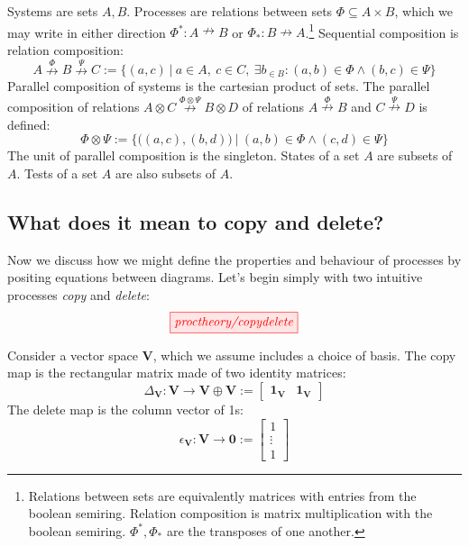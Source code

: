 \begin{example}
Systems are sets $A,B$. Processes are relations between sets $\Phi \subseteq A \times B$, which we may write in either direction $\Phi^*: A \nrightarrow B$ or $\Phi_*: B \nrightarrow A$.\footnote{Relations between sets are equivalently matrices with entries from the boolean semiring. Relation composition is matrix multiplication with the boolean semiring. $\Phi^*,\Phi_*$ are the transposes of one another.}
Sequential composition is relation composition:
\[A \overset{\Phi}{\nrightarrow} B \overset{\Psi}{\nrightarrow} C := \{(a,c) \ | \  a \in A, \ c \in C, \ \exists b_{\in B}: (a,b) \in \Phi \wedge (b,c) \in \Psi  \}\]
Parallel composition of systems is the cartesian product of sets. The parallel composition of relations $A \otimes C \overset{\Phi \otimes \Psi}{\nrightarrow} B \otimes D$ of relations $A \overset{\Phi}{\nrightarrow} B$ and $C \overset{\Psi}{\nrightarrow} D$ is defined:
\[\Phi \otimes \Psi := \{\big( (a,c) , (b,d) \big) \ | \ (a,b) \in \Phi \wedge (c,d) \in \Psi\}\]
The unit of parallel composition is the singleton. States of a set $A$ are subsets of $A$. Tests of a set $A$ are also subsets of $A$.
\end{example}

\subsection{What does it mean to copy and delete?}

Now we discuss how we might define the properties and behaviour of processes by positing equations between diagrams. Let's begin simply with two intuitive processes \emph{copy} and \emph{delete}:
\[\tikzfig{proctheory/copydelete}\]

\begin{example}
Consider a vector space $\mathbf{V}$, which we assume includes a choice of basis. The copy map is the rectangular matrix made of two identity matrices:
\[\Delta_\mathbf{V}: \mathbf{V} \rightarrow \mathbf{V} \oplus \mathbf{V} := \begin{bmatrix} \mathbf{1}_\mathbf{V} & \mathbf{1}_\mathbf{V} \end{bmatrix}\]
The delete map is the column vector of 1s:
\[\epsilon_\mathbf{V}: \mathbf{V} \rightarrow \mathbf{0} := \begin{bmatrix} 1 \\ \vdots \\ 1 \end{bmatrix}\]
\end{example}

